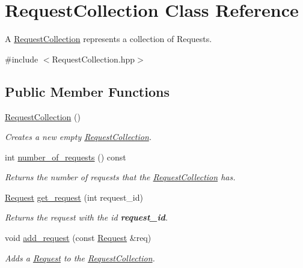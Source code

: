 \hypertarget{class_request_collection}{\section{Request\-Collection Class Reference}
\label{de/d60/class_request_collection}
}


A \hyperlink{class_request_collection}{Request\-Collection} represents a collection of Requests.  




{\ttfamily \#include $<$Request\-Collection.\-hpp$>$}

\subsection*{Public Member Functions}
\begin{DoxyCompactItemize}
\item 
\hyperlink{class_request_collection_a185bbbd64b7f3fbc8602c1aeb5ef2ddf}{Request\-Collection} ()
\begin{DoxyCompactList}\small\item\em Creates a new empty \hyperlink{class_request_collection}{Request\-Collection}. \end{DoxyCompactList}\item 
int \hyperlink{class_request_collection_a3253b1d4890067c96c26887c3d924008}{number\-\_\-of\-\_\-requests} () const 
\begin{DoxyCompactList}\small\item\em Returns the number of requests that the \hyperlink{class_request_collection}{Request\-Collection} has. \end{DoxyCompactList}\item 
\hyperlink{class_request}{Request} \hyperlink{class_request_collection_ad6cb0526cde453266f583b14f4f1eb8d}{get\-\_\-request} (int request\-\_\-id)
\begin{DoxyCompactList}\small\item\em Returns the request with the id {\bfseries request\-\_\-id}. \end{DoxyCompactList}\item 
void \hyperlink{class_request_collection_ae3697bf1a2308203c8f4c375d71dc934}{add\-\_\-request} (const \hyperlink{class_request}{Request} \&req)
\begin{DoxyCompactList}\small\item\em Adds a \hyperlink{class_request}{Request} to the \hyperlink{class_request_collection}{Request\-Collection}. \end{DoxyCompactList}\end{DoxyCompactItemize}


